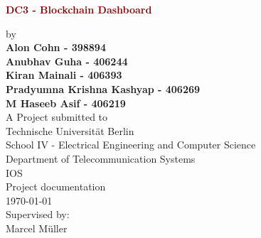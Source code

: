 \begin{titlepage}
	\strut
	\hfill
	\begin{center}
	\vspace{1cm}
		\Huge
		\begin{spacing}{.9}
			\textcolor{DarkRed}{\textbf{DC3 - Blockchain Dashboard}}\\
		\end{spacing}
		\vspace{0.8cm}
		\large
		by\\
		\vspace{0.8cm}
		\textbf{Alon Cohn - 398894}\\
		\textbf{Anubhav Guha - 406244}\\
		\textbf{Kiran Mainali - 406393}\\
		\textbf{Pradyumna Krishna Kashyap - 406269}\\
		\textbf{M Haseeb Asif - 406219}\\
		\vspace{0.8cm}
		\vspace{2cm}
	 	A Project submitted to\\
		\vspace{0.5cm}
		Technische Universität Berlin\\
		School IV - Electrical Engineering and Computer Science\\
		Department of Telecommunication Systems\\
		IOS\\
		\vspace{0.5cm}
		Project documentation\\
		\vspace{2.2cm}
		\today\\
		\vspace{2.0cm}
		\large
		Supervised by:\\
    	Marcel Müller\\
		\vspace{1cm}
		\end{center}
\end{titlepage}

